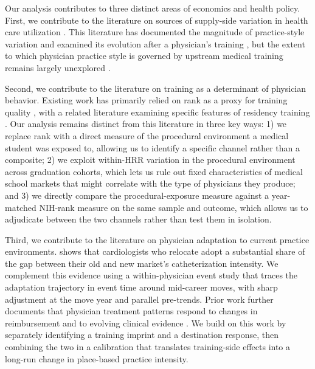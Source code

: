 \documentclass[12pt]{article}
\let\textcite\citet
\begin{document}
Our analysis contributes to three distinct areas of economics and health policy. First, we contribute to the literature on sources of supply-side variation in health care utilization \citep{finkelstein2016}. This literature has documented the magnitude of practice-style variation and examined its evolution after a physician's training \citep{molitor2018, cutler2019, badinski2023}, but the extent to which physician practice style is governed by upstream medical training remains largely unexplored \citep{finkelstein2026}.

Second, we contribute to the literature on training as a determinant of physician behavior. Existing work has primarily relied on rank as a proxy for training quality \citep{schnell2018, doyle_jr_returns_2010}, with a related literature examining specific features of residency training \citep{epstein2009}. Our analysis remains distinct from this literature in three key ways: 1) we replace rank with a direct measure of the procedural environment a medical student was exposed to, allowing us to identify a specific channel rather than a composite; 2) we exploit within-HRR variation in the procedural environment across graduation cohorts, which lets us rule out fixed characteristics of medical school markets that might correlate with the type of physicians they produce; and 3) we directly compare the procedural-exposure measure against a year-matched NIH-rank measure on the same sample and outcome, which allows us to adjudicate between the two channels rather than test them in isolation.

Third, we contribute to the literature on physician adaptation to current practice environments. \textcite{molitor2018} shows that cardiologists who relocate adopt a substantial share of the gap between their old and new market's catheterization intensity. We complement this evidence using a within-physician event study that traces the adaptation trajectory in event time around mid-career moves, with sharp adjustment at the move year and parallel pre-trends. Prior work further documents that physician treatment patterns respond to changes in reimbursement \citep{clemens2014} and to evolving clinical evidence \citep{decicca_how_2024}. We build on this work by separately identifying a training imprint and a destination response, then combining the two in a calibration that translates training-side effects into a long-run change in place-based practice intensity.
\end{document}
